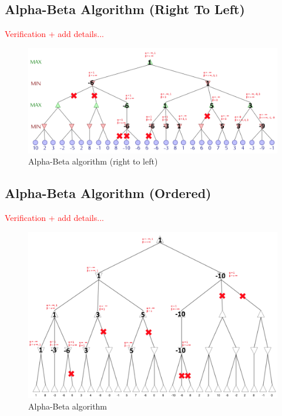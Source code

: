 \documentclass[journal,onecolumn]{IEEEtran}
\begin{document}
\subsection{Alpha-Beta Algorithm (Right To Left)}

\textcolor{red}{Verification + add details...}

\begin{figure}[H]
 \centering
 \includegraphics[width=\textwidth]{img/Alphabeta_reverse.png}
 \caption{Alpha-Beta algorithm (right to left)}
 \label{fig:alphabeta_reverse}
\end{figure}


\subsection{Alpha-Beta Algorithm (Ordered)}

\textcolor{red}{Verification + add details...}

\begin{figure}[H]
 \centering
 \includegraphics[width=\textwidth]{img/Alphabeta_ordered.png}
 \caption{Alpha-Beta algorithm}
 \label{fig:alphabeta_ordered}
\end{figure}
\end{document}
